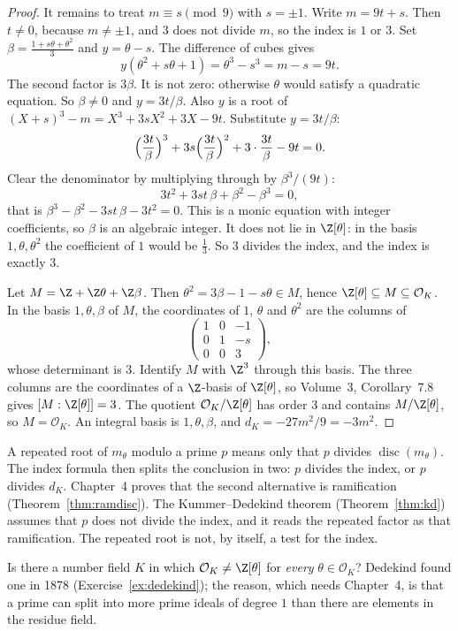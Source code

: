 \begin{proof}
It remains to treat $m\equiv s\pmod9$ with $s=\pm1$. Write $m=9t+s$. Then $t\ne0$, because $m\ne\pm1$, and $3$ does
not divide $m$, so the index is $1$ or $3$. Set $\beta=\frac{1+s\theta+\theta^2}3$ and $y=\theta-s$. The difference
of cubes gives
\[
y(\theta^2+s\theta+1)=\theta^3-s^3=m-s=9t.
\]
The second factor is $3\beta$. It is not zero: otherwise $\theta$ would satisfy a quadratic equation. So $\beta\ne0$ and
$y=3t/\beta$. Also $y$ is a
root of $(X+s)^3-m=X^3+3sX^2+3X-9t$. Substitute $y=3t/\beta$:
\[
\Bigl(\frac{3t}{\beta}\Bigr)^3+3s\Bigl(\frac{3t}{\beta}\Bigr)^2+3\cdot\frac{3t}{\beta}-9t=0.
\]
Clear the denominator by multiplying through by $\beta^3/(9t)$:
\[
3t^2+3st\,\beta+\beta^2-\beta^3=0,
\]
that is $\beta^3-\beta^2-3st\,\beta-3t^2=0$. This is a monic equation with integer coefficients, so $\beta$ is an
algebraic integer. It does not lie in $\Z[\theta]$: in the basis $1,\theta,\theta^2$ the coefficient of $1$ would be
$\frac13$. So $3$ divides the index, and the index is exactly $3$.

Let $M=\Z+\Z\theta+\Z\beta$. Then $\theta^2=3\beta-1-s\theta\in M$, hence $\Z[\theta]\subseteq M\subseteq\mathcal O_K$.
In the basis $1,\theta,\beta$ of $M$, the coordinates of $1$, $\theta$ and $\theta^2$ are the columns of
\[
\begin{pmatrix}1&0&-1\\0&1&-s\\0&0&3\end{pmatrix},
\]
whose determinant is $3$. Identify $M$ with $\Z^3$ through this basis. The three columns are the coordinates of a
$\Z$-basis of $\Z[\theta]$, so Volume~3, Corollary~7.8 gives $[M:\Z[\theta]]=3$. The quotient $\mathcal O_K/\Z[\theta]$
has order $3$ and contains $M/\Z[\theta]$, so $M=\mathcal O_K$. An integral basis is $1,\theta,\beta$, and
$d_K=-27m^2/9=-3m^2$.
\end{proof}

A repeated root of $m_\theta$ modulo a prime $p$ means only that $p$ divides $\operatorname{disc}(m_\theta)$. The
index formula then splits the conclusion in two: $p$ divides the index, or $p$ divides $d_K$. Chapter~4 proves that
the second alternative is ramification (Theorem~\ref{thm:ramdisc}). The Kummer--Dedekind theorem
(Theorem~\ref{thm:kd}) assumes that $p$ does not divide the index, and it reads the repeated factor as that
ramification. The repeated root is not, by itself, a test for the index.

\begin{think}
Is there a number field $K$ in which $\mathcal O_K\ne\Z[\theta]$ for \emph{every} $\theta\in\mathcal O_K$? Dedekind found one
in 1878 (Exercise~\ref{ex:dedekind}); the reason, which needs Chapter~4, is that a prime can split into more prime
ideals of degree $1$ than there are elements in the residue field.
\end{think}

